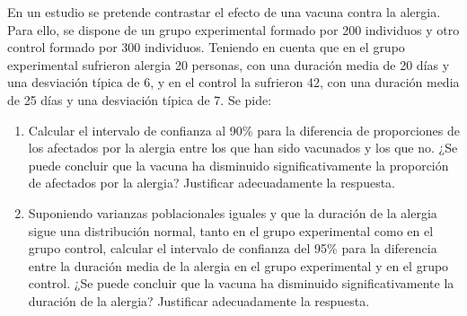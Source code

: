 {En un estudio se pretende contrastar el efecto de una vacuna contra la alergia. Para ello, se dispone de un grupo experimental formado por
200 individuos y otro control formado por 300 individuos.
Teniendo en cuenta que en el grupo experimental sufrieron alergia 20 personas, con una duración media de 20 días y una desviación típica de
6, y en el control la sufrieron 42, con una duración media de 25 días y una desviación típica de 7.
Se pide:
\begin{enumerate}
\item Calcular el intervalo de confianza al 90\% para la diferencia de proporciones de los afectados por la alergia entre los que han sido
vacunados y los que no. ¿Se puede concluir que la vacuna ha disminuido significativamente la proporción de afectados por la alergia? Justificar adecuadamente la respuesta. 
\item Suponiendo varianzas poblacionales iguales y que la duración de la alergia sigue una distribución normal, tanto en el grupo
experimental como en el grupo control, calcular el intervalo de confianza del 95\% para la diferencia entre la duración media de la alergia
en el grupo experimental y en el grupo control. ¿Se puede concluir que la vacuna ha disminuido significativamente la duración de la alergia? Justificar adecuadamente la respuesta.  
\end{enumerate}
}
{
}
{
}

